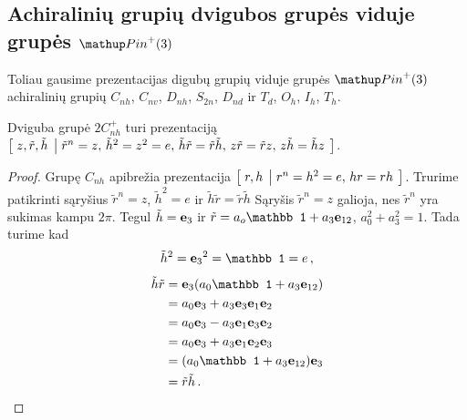 
\subsection{Achiralinių grupių dvigubos grupės viduje grupės \texorpdfstring{$\pinp$}{Pin+(3)}}

Toliau gausime prezentacijas digubų grupių viduje grupės $\pinp$ achiralinių grupių
$C_{nh}$, $C_{nv}$, $D_{nh}$, $S_{2n}$, $D_{nd}$ ir $T_d$, $O_h$, $I_h$, $T_h$.

\begin{proposition}
	Dviguba grupė $2C_{nh}^+$ turi prezentaciją
	$\left[\; z,\tilde r,\tilde h \;\left|\; 
		\tilde r^n=z,\,
		\tilde h^2=z^2=e,\,
		\tilde h\tilde r=\tilde r\tilde h,\,
		z\tilde r=\tilde rz,\,
		z\tilde h=\tilde hz
	 \;\right.\right]$.
\end{proposition}
\begin{proof}
	Grupę $C_{nh}$ apibrežia prezentacija $\left[\; r,h \;\left|\; r^n=h^2=e,\, hr=rh \;\right.\right]$.
	Trurime patikrinti sąryšius $\tilde r^n=z$, $\tilde h^2=e$ ir $\tilde h\tilde r=\tilde r\tilde h$
	Sąryšis $\tilde r^n=z$ galioja, nes $\tilde r^n$ yra sukimas kampu $2\pi$.
	Tegul $\tilde h = \vb e_3$ ir $\tilde r = a_o\mathbb1 + a_3 \vb e_{12}$, $a_0^2+a_3^2=1$.
	Tada turime kad
	\begin{equation}
		\tilde h^2 = {\vb e_3}^2 = \mathbb1 = e
		\,,
	\end{equation}
	\begin{equation}
		\begin{aligned}
			\tilde h\tilde r 
			&=\vb e_3 (a_0 \mathbb 1 + a_3 \vb e_{12} )
			\\&=a_0 \vb e_3  + a_3\vb e_3 \vb e_1 \vb e_2
			\\&=a_0 \vb e_3  - a_3\vb e_1 \vb e_3 \vb e_2
			\\&=a_0 \vb e_3  + a_3\vb e_1 \vb e_2 \vb e_3
			\\&=(a_0 \mathbb 1 + a_3 \vb e_{12} )\vb e_3
			\\&=\tilde r\tilde h
			\,.
		\end{aligned}
	\end{equation}
\end{proof}

